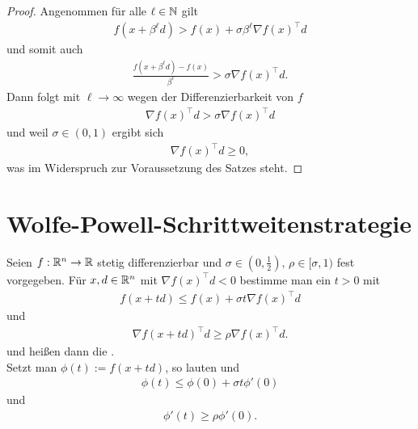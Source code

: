 \begin{proof}
	Angenommen für alle $\ell \in \mathbb{N}$ gilt
	\begin{align*}
		f(x+ \beta^\ell d) > f(x)+ \sigma \beta^\ell \nabla f(x)^{\top} d
	\end{align*}
	und somit auch
	\begin{align*}
		\frac {f(x+ \beta^\ell d) - f(x)}{\beta^\ell} > \sigma \nabla f(x)^{\top} d.
	\end{align*}
	Dann folgt mit $\ell \to \infty$ wegen der Differenzierbarkeit von $f$
	\begin{align*}
		\nabla f(x)^{\top} d > \sigma \nabla f(x)^{\top} d
	\end{align*}
	und weil $\sigma \in (0,1)$ ergibt sich
	\begin{align*}
		\nabla f(x)^{\top} d \geq 0,
	\end{align*}
	was im Widerspruch zur Voraussetzung des Satzes steht.
\end{proof}


\section{Wolfe-Powell-Schrittweitenstrategie}

\begin{definition}
	Seien $f: \mathbb{R}^n \to \mathbb{R}$ stetig differenzierbar und $\sigma \in (0, \frac{1}{2}), \, \rho \in [\sigma, 1)$ fest vorgegeben. Für $x,d \in \mathbb{R}^n$ mit $\nabla f(x)^{\top} d <0$ bestimme man ein $t >0$ mit 
	\begin{align}
		f(x+td) \leq f(x) + \sigma t \nabla f(x)^{\top} d \label{w_p_1}
	\end{align}
	und
	\begin{align}
		\nabla f(x+td)^{\top} d \geq \rho \nabla f(x)^{\top} d. \label{w_p_2}
	\end{align}
	 und  heißen dann die . \\ Setzt man $\phi(t) := f(x+td)$, so lauten  und 
	\begin{align*}
		\phi (t) \leq \phi (0)+\sigma t \phi' (0)
	\end{align*}
	und
	\begin{align*}
		\phi'(t) \geq \rho \phi' (0).
	\end{align*}
\end{definition}


